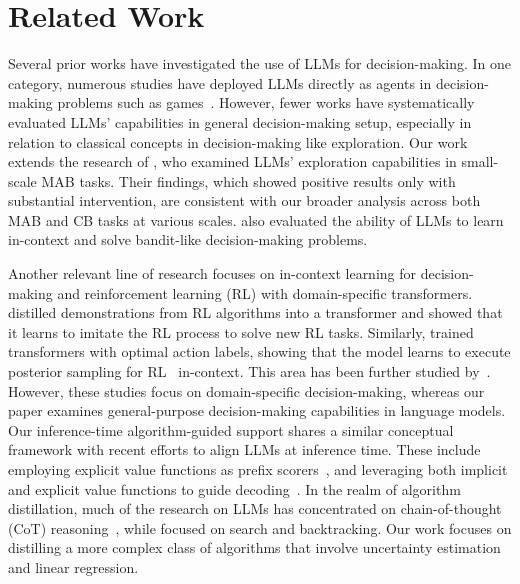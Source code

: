 \section{Related Work}

Several prior works have investigated the use of LLMs for decision-making. In one category, numerous studies have deployed LLMs directly as agents in decision-making problems such as games~\citep{yao2023react,brooks2024large,shinn2024reflexion,wang2023voyager,xi2023rise}. However, fewer works have systematically evaluated LLMs' capabilities in general decision-making setup, especially in relation to classical concepts in decision-making like exploration. Our work extends the research of \citet{krishnamurthy2024can}, who examined LLMs' exploration capabilities in small-scale MAB tasks. Their findings, which showed positive results only with substantial intervention, are consistent with our broader analysis across both MAB and CB tasks at various scales. \citet{mirchandani2023large,rahn2024controlling,felicioni2024importance} also evaluated the ability of LLMs to learn in-context and solve bandit-like decision-making problems.

Another relevant line of research focuses on in-context learning for decision-making and reinforcement learning (RL) with domain-specific transformers. \citet{laskin2022context} distilled demonstrations from RL algorithms into a transformer and showed that it learns to imitate the RL process to solve new RL tasks. Similarly, \citet{lee2024supervised} trained transformers with optimal action labels, showing that the model learns to execute posterior sampling for RL~\citep{osband2013more} in-context. This area has been further studied by~\citet{raparthy2023generalization,lin2023transformers,bai2023transformers}. However, these studies focus on domain-specific decision-making, whereas our paper examines general-purpose decision-making capabilities in language models. 
Our inference-time algorithm-guided support shares a similar conceptual framework with recent efforts to align LLMs at inference time. These include employing explicit value functions as prefix scorers~\citep{mudgal2023controlled}, and leveraging both implicit and explicit value functions to guide decoding~\citep{liu2024inference}. 
In the realm of algorithm distillation, much of the research on LLMs has concentrated on chain-of-thought (CoT) reasoning~\citep{wang2023scott, li2023symbolic}, while \cite{gandhi2024stream} focused on search and backtracking. Our work focuses on distilling a more complex class of algorithms that involve uncertainty estimation and linear regression.


